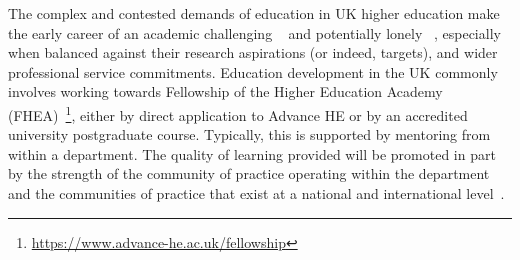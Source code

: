 \documentclass[sigconf]{acmart}
\begin{document}
The complex and contested demands of education in UK higher education make the early career of an academic challenging ~\cite{Thomas2015} and potentially lonely ~\cite{Foote2009}, especially when balanced against their research aspirations (or indeed, targets), and wider professional service commitments. Education development in the UK commonly involves working towards Fellowship of the Higher Education Academy (FHEA)~\footnote{\url{https://www.advance-he.ac.uk/fellowship}}, either by direct application to Advance HE or by an accredited university postgraduate course. Typically, this is supported by mentoring from within a department. The quality of learning provided will be promoted in part by the strength of the community of practice operating within the department~\cite{Bolander2008} and the communities of practice that exist at a national and international level~\cite{Thomas2015}.
\end{document}

